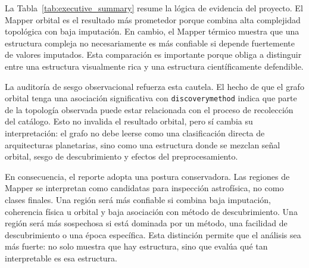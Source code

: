 La Tabla~\ref{tab:executive_summary} resume la lógica de evidencia del proyecto. El Mapper orbital es el resultado más prometedor porque combina alta complejidad topológica con baja imputación. En cambio, el Mapper térmico muestra que una estructura compleja no necesariamente es más confiable si depende fuertemente de valores imputados. Esta comparación es importante porque obliga a distinguir entre una estructura visualmente rica y una estructura científicamente defendible.

La auditoría de sesgo observacional refuerza esta cautela. El hecho de que el grafo orbital tenga una asociación significativa con \texttt{discoverymethod} indica que parte de la topología observada puede estar relacionada con el proceso de recolección del catálogo. Esto no invalida el resultado orbital, pero sí cambia su interpretación: el grafo no debe leerse como una clasificación directa de arquitecturas planetarias, sino como una estructura donde se mezclan señal orbital, sesgo de descubrimiento y efectos del preprocesamiento.

En consecuencia, el reporte adopta una postura conservadora. Las regiones de Mapper se interpretan como candidatas para inspección astrofísica, no como clases finales. Una región será más confiable si combina baja imputación, coherencia física u orbital y baja asociación con método de descubrimiento. Una región será más sospechosa si está dominada por un método, una facilidad de descubrimiento o una época específica. Esta distinción permite que el análisis sea más fuerte: no solo muestra que hay estructura, sino que evalúa qué tan interpretable es esa estructura.

